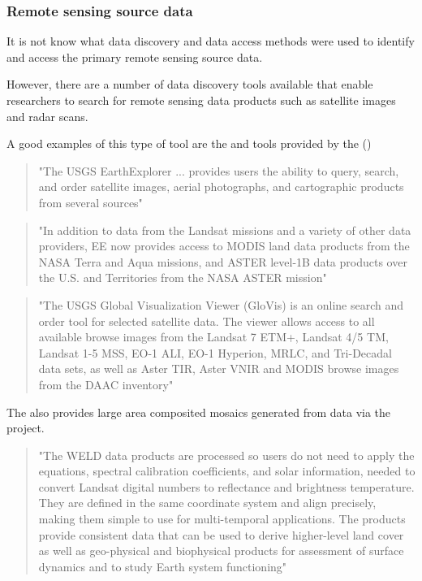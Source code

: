 \documentclass{article}
\begin{document}
\subsubsection{Remote sensing source data}

It is not know what data discovery and data access methods were used to
identify and access the primary remote sensing source data.

However, there are a number of data discovery tools available that enable
researchers to search for remote sensing data products such as satellite
images and radar scans.

A good examples of this type of tool are the
\cite{usgs-explorer}
and
\cite{usgs-glovis}
tools provided by the
 (\cite{usgs})
    
\begin{quote}
"The USGS EarthExplorer ... provides users the ability to query, search,
and order satellite images, aerial photographs, and cartographic products from
several sources"
\end{quote}

\begin{quote}
"In addition to data from the Landsat missions and a variety of other data providers,
EE now provides access to MODIS land data products from the NASA Terra and Aqua missions,
and ASTER level-1B data products over the U.S. and Territories from the NASA ASTER mission"
\end{quote}

\begin{quote}
"The USGS Global Visualization Viewer (GloVis) is an online search and order tool for
selected satellite data. The viewer allows access to all available browse images
from the Landsat 7 ETM+, Landsat 4/5 TM, Landsat 1-5 MSS, EO-1 ALI, EO-1 Hyperion,
MRLC, and Tri-Decadal data sets, as well as Aster TIR, Aster VNIR and MODIS browse
images from the DAAC inventory"
\end{quote}

The \cite{usgs} also provides large area composited mosaics generated from
\cite{landsat}
data via the
\cite{weld}
project.

\begin{quote}
"The WELD data products are processed so users do not need to apply the equations,
spectral calibration coefficients, and solar information, needed to convert Landsat
digital numbers to reflectance and brightness temperature.
They are defined in the same coordinate system and align precisely, making them simple
to use for multi-temporal applications.
The products provide consistent data that can be used to derive higher-level land
cover as well as geo-physical and biophysical products for assessment of surface
dynamics and to study Earth system functioning"
\end{quote}
\end{document}
